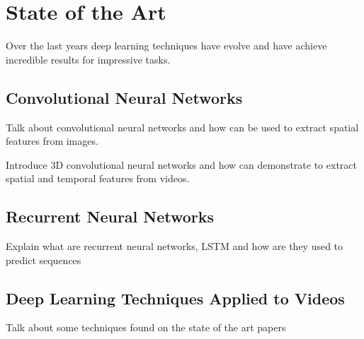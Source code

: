 \chapter{State of the Art}

Over the last years deep learning techniques have evolve and have achieve incredible results for impressive tasks.

\section{Convolutional Neural Networks}

Talk about convolutional neural networks and how can be used to extract spatial features from images.

Introduce 3D convolutional neural networks and how can demonstrate to extract spatial and temporal features from videos.

\section{Recurrent Neural Networks}

Explain what are recurrent neural networks, LSTM and how are they used to predict sequences

\section{Deep Learning Techniques Applied to Videos}

Talk about some techniques found on the state of the art papers
